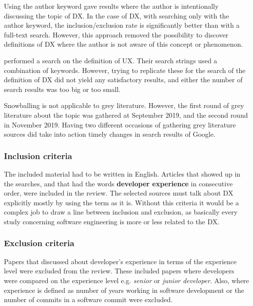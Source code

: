 \documentclass[english, 12pt, a4paper, sci, utf8, a-1b, online]{aaltothesis}
\newcounter{subsubsubsection}[subsubsection]
\begin{document}
Using the author keyword gave results where the author is intentionally discussing the topic of DX. In the case of DX, with searching only with the author keyword, the inclusion/exclusion rate is significantly better than with a full-text search. However, this approach removed the possibility to discover definitions of DX where the author is not aware of this concept or phenomenon.

\cite{understanding-ux} performed a search on the definition of UX. Their search strings used a combination of keywords. However, trying to replicate these for the search of the definition of DX did not yield any satisfactory results, and either the number of search results was too big or too small.


Snowballing is not applicable to grey literature. However, the first round of grey literature about the topic was gathered at September 2019, and the second round in November 2019. Having two different occasions of gathering grey literature sources did take into action timely changes in search results of Google.




\subsubsection{Inclusion criteria}

The included material had to be written in English. Articles that showed up in the searches, and that had the words \textbf{developer experience} in consecutive order, were included in the review. The selected sources must talk about DX explicitly mostly by using the term as it is. Without this criteria it would be a complex job to draw a line between inclusion and exclusion, as basically every study concerning software engineering is more or less related to the DX.

\subsubsection{Exclusion criteria}

Papers that discussed about developer's experience in terms of the experience level were excluded from the review. These included papers where developers were compared on the experience level e.g. \textit{senior} or \textit{junior developer}. Also, where experience is defined as number of years working in software development or the number of commits in a software commit were excluded.
\end{document}
